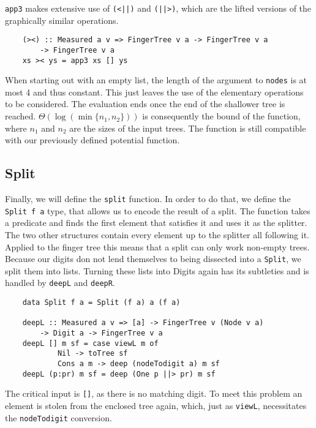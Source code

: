 \texttt{app3} makes extensive use of \texttt{(<||)} and \texttt{(||>)}, which are the lifted versions of the graphically similar operations.

\begin{verbatim}
    (><) :: Measured a v => FingerTree v a -> FingerTree v a
        -> FingerTree v a
    xs >< ys = app3 xs [] ys
\end{verbatim}

When starting out with an empty list, the length of the argument to \texttt{nodes} is at most 4 and thus constant. This just leaves the use of the elementary operations to be considered. The evaluation ends once the end of the shallower tree is reached. \(\Theta(\log(\min\{n_1,n_2\}))\) is consequently the bound of the function, where \(n_1\) and \(n_2\) are the sizes of the input trees. The function is still compatible with our previously defined potential function.\par

\subsection{Split}

Finally, we will define the \texttt{split} function. In order to do that, we define the \texttt{Split f a} type, that allows us to encode the result of a split. The function takes a predicate and finds the first element that satisfies it and uses it as the splitter. The two other structures contain every element up to the splitter all following it. Applied to the finger tree this means that a split can only work non-empty trees. Because our digits don not lend themselves to being dissected into a \texttt{Split}, we split them into lists. Turning these lists into Digits again has its subtleties and is handled by \texttt{deepL} and \texttt{deepR}.

\begin{verbatim}
    data Split f a = Split (f a) a (f a)

    deepL :: Measured a v => [a] -> FingerTree v (Node v a)
        -> Digit a -> FingerTree v a
    deepL [] m sf = case viewL m of
            Nil -> toTree sf
            Cons a m -> deep (nodeTodigit a) m sf
    deepL (p:pr) m sf = deep (One p ||> pr) m sf
\end{verbatim}

The critical input is \texttt{[]}, as there is no matching digit. To meet this problem
    an element is stolen from the enclosed tree again, which, just as \texttt{viewL}, necessitates the \texttt{nodeTodigit} conversion.

